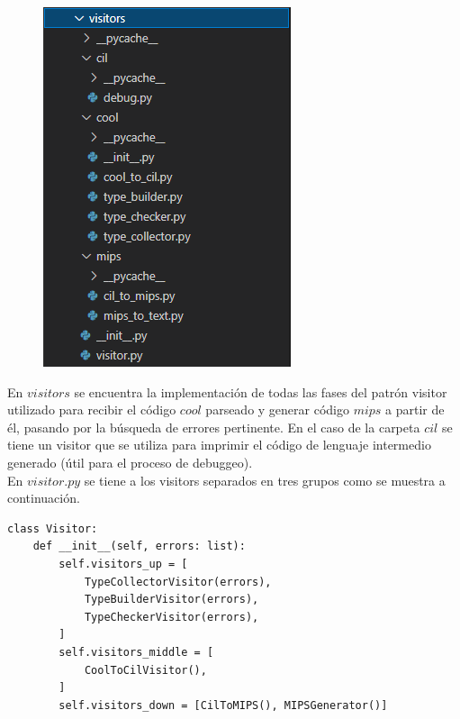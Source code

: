 \documentclass[a4paper,12pt]{article}
\begin{document}
\begin{figure}[H]
\centering
\includegraphics[width=0.9\linewidth]{./3}
\caption{}
\label{fig:3}
\end{figure}

En $visitors$ se encuentra la implementación de todas las fases del patrón visitor utilizado para recibir el código $cool$ parseado y generar código $mips$ a partir de él, pasando por la búsqueda de errores pertinente. En el caso de la carpeta $cil$ se tiene un visitor que se utiliza para imprimir el código de lenguaje intermedio generado (útil para el proceso de debuggeo).\\

En $visitor.py$ se tiene a los visitors separados en tres grupos como se muestra a continuación.

\begin{lstlisting}
class Visitor:
    def __init__(self, errors: list):
        self.visitors_up = [
            TypeCollectorVisitor(errors),
            TypeBuilderVisitor(errors),
            TypeCheckerVisitor(errors),
        ]
        self.visitors_middle = [
            CoolToCilVisitor(),
        ]
        self.visitors_down = [CilToMIPS(), MIPSGenerator()]
\end{lstlisting}
\end{document}
